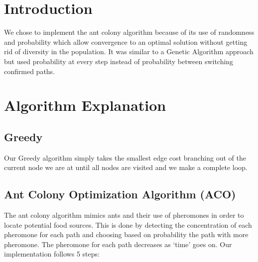 



\section{Introduction} %

We chose to implement the ant colony algorithm because of its use of randomness and probability which allow convergence to an optimal solution without getting rid of diversity in the population. It was similar to a Genetic Algorithm approach but used probability at every step instead of probability between switching confirmed paths.


\section{Algorithm Explanation} %

\subsection*{Greedy}
Our Greedy algorithm simply takes the smallest edge cost branching out of the current node we are at until all nodes are visited and we make a complete loop.

\subsection*{Ant Colony Optimization Algorithm (ACO)}
The ant colony algorithm \cite{Skinderowicz_2022} mimics ants and their use of pheromones in order to locate potential food sources. This is done by detecting the concentration of each pheromone for each path and choosing based on probability the path with more pheromone. The pheromone for each path decreases as ‘time’ goes on.
Our implementation follows 5 steps:

